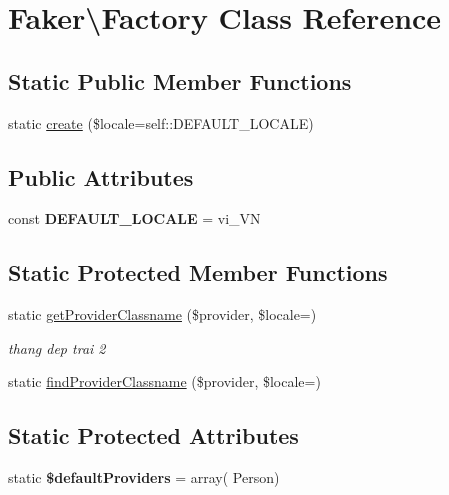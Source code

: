 \hypertarget{classFaker_1_1Factory}{}\section{Faker\textbackslash{}Factory Class Reference}
\label{classFaker_1_1Factory}
\subsection*{Static Public Member Functions}
\begin{DoxyCompactItemize}
\item 
static \hyperlink{classFaker_1_1Factory_a98e6f274219744ee33c7434c1d2668ad}{create} (\$locale=self\+::\+D\+E\+F\+A\+U\+L\+T\+\_\+\+L\+O\+C\+A\+LE)
\end{DoxyCompactItemize}
\subsection*{Public Attributes}
\begin{DoxyCompactItemize}
\item 
\mbox{\label{classFaker_1_1Factory_a2e6398cb8fab0e3296424a76bc982050}} 
const {\bfseries D\+E\+F\+A\+U\+L\+T\+\_\+\+L\+O\+C\+A\+LE} = \textquotesingle{}vi\+\_\+\+VN\textquotesingle{}
\end{DoxyCompactItemize}
\subsection*{Static Protected Member Functions}
\begin{DoxyCompactItemize}
\item 
static \hyperlink{classFaker_1_1Factory_aa70262f20e04ea6091a61adc848c0631}{get\+Provider\+Classname} (\$provider, \$locale=\textquotesingle{}\textquotesingle{})
\begin{DoxyCompactList}\small\item\em thang dep trai 2 \end{DoxyCompactList}\item 
static \hyperlink{classFaker_1_1Factory_a775386565ba237a11fccd08f29fecfb7}{find\+Provider\+Classname} (\$provider, \$locale=\textquotesingle{}\textquotesingle{})
\end{DoxyCompactItemize}
\subsection*{Static Protected Attributes}
\begin{DoxyCompactItemize}
\item 
\mbox{\label{classFaker_1_1Factory_ad397e0c679c72af873911350b2232187}} 
static {\bfseries \$default\+Providers} = array( \textquotesingle{}Person\textquotesingle{})
\end{DoxyCompactItemize}


